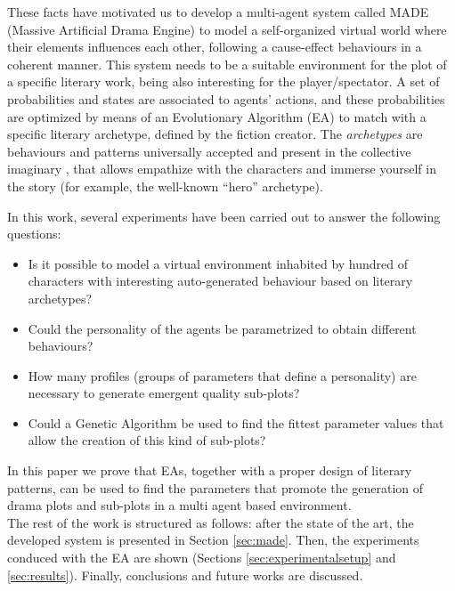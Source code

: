 \documentclass[runningheads]{llncs}
\begin{document}
These facts have motivated us to develop a multi-agent system called MADE (Massive Artificial Drama Engine) to model a self-organized virtual world where their elements influences each other, following a cause-effect behaviours in a coherent manner. This system needs to be a suitable environment for the plot of a specific literary work, being also interesting for the player/spectator. A set of probabilities and states are associated to agents' actions, and these probabilities are optimized by means of an Evolutionary Algorithm (EA) to match with a specific literary archetype, defined by the fiction creator. The {\em archetypes} are behaviours and patterns universally accepted and present in the collective imaginary \cite{ArchetypesGarry05}, that allows empathize with the characters and immerse yourself in the story (for example, the well-known ``hero'' archetype).

In this work, several experiments have been carried out to answer the following questions: 

\begin{itemize}
 \item Is it possible to model a virtual environment inhabited by hundred of characters with interesting auto-generated behaviour based on literary archetypes?
 \item Could the personality of the agents be parametrized to obtain different behaviours? 
 \item How many profiles (groups of parameters that define a personality) are necessary to generate emergent quality sub-plots?
 \item Could a Genetic Algorithm be used to find the fittest parameter values that allow the creation of this kind of sub-plots?
\end{itemize}

In this paper we prove that EAs, together with a proper design of literary patterns, can be used to find the parameters that promote the generation of drama plots and sub-plots in a multi agent based environment.\\

The rest of the work is structured as follows: after the state of the art, the developed system is presented in Section \ref{sec:made}. Then, the experiments conduced with the EA are shown (Sections \ref{sec:experimentalsetup} and \ref{sec:results}). Finally, conclusions and future works are discussed.

\end{document}
